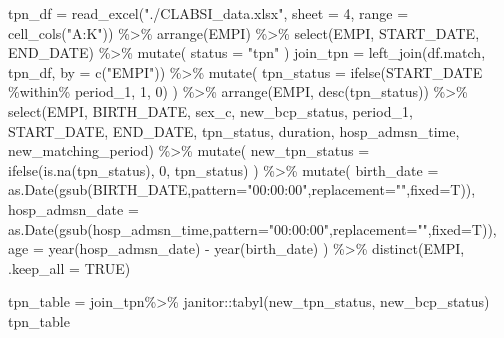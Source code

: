 \documentclass[
]{article}
\newenvironment{Shaded}{\begin{snugshade}}{\end{snugshade}}
\newcommand{\AttributeTok}[1]{\textcolor[rgb]{0.77,0.63,0.00}{#1}}
\newcommand{\ConstantTok}[1]{\textcolor[rgb]{0.00,0.00,0.00}{#1}}
\newcommand{\DecValTok}[1]{\textcolor[rgb]{0.00,0.00,0.81}{#1}}
\newcommand{\FunctionTok}[1]{\textcolor[rgb]{0.00,0.00,0.00}{#1}}
\newcommand{\NormalTok}[1]{#1}
\newcommand{\OtherTok}[1]{\textcolor[rgb]{0.56,0.35,0.01}{#1}}
\newcommand{\SpecialCharTok}[1]{\textcolor[rgb]{0.00,0.00,0.00}{#1}}
\newcommand{\StringTok}[1]{\textcolor[rgb]{0.31,0.60,0.02}{#1}}
\begin{document}
\begin{Shaded}
\begin{Highlighting}[]
\NormalTok{tpn\_df }\OtherTok{=}
   \FunctionTok{read\_excel}\NormalTok{(}\StringTok{"./CLABSI\_data.xlsx"}\NormalTok{, }\AttributeTok{sheet =} \DecValTok{4}\NormalTok{, }\AttributeTok{range =} \FunctionTok{cell\_cols}\NormalTok{(}\StringTok{"A:K"}\NormalTok{)) }\SpecialCharTok{\%\textgreater{}\%} 
  \FunctionTok{arrange}\NormalTok{(EMPI) }\SpecialCharTok{\%\textgreater{}\%} 
  \FunctionTok{select}\NormalTok{(EMPI, START\_DATE, END\_DATE) }\SpecialCharTok{\%\textgreater{}\%} 
  \FunctionTok{mutate}\NormalTok{(}
    \AttributeTok{status =} \StringTok{"tpn"}
\NormalTok{  )}
\NormalTok{join\_tpn }\OtherTok{=} 
  \FunctionTok{left\_join}\NormalTok{(df.match, tpn\_df, }\AttributeTok{by =} \FunctionTok{c}\NormalTok{(}\StringTok{"EMPI"}\NormalTok{)) }\SpecialCharTok{\%\textgreater{}\%} 
  \FunctionTok{mutate}\NormalTok{(}
    \AttributeTok{tpn\_status =} \FunctionTok{ifelse}\NormalTok{(START\_DATE }\SpecialCharTok{\%within\%}\NormalTok{ period\_1, }\DecValTok{1}\NormalTok{, }\DecValTok{0}\NormalTok{)}
\NormalTok{  ) }\SpecialCharTok{\%\textgreater{}\%} 
    \FunctionTok{arrange}\NormalTok{(EMPI, }\FunctionTok{desc}\NormalTok{(tpn\_status)) }\SpecialCharTok{\%\textgreater{}\%} 
  \FunctionTok{select}\NormalTok{(EMPI, BIRTH\_DATE, sex\_c, new\_bcp\_status, period\_1, START\_DATE, END\_DATE, tpn\_status, duration, hosp\_admsn\_time, new\_matching\_period) }\SpecialCharTok{\%\textgreater{}\%} 
  \FunctionTok{mutate}\NormalTok{(}
    \AttributeTok{new\_tpn\_status =} \FunctionTok{ifelse}\NormalTok{(}\FunctionTok{is.na}\NormalTok{(tpn\_status), }\DecValTok{0}\NormalTok{, tpn\_status)}
\NormalTok{  ) }\SpecialCharTok{\%\textgreater{}\%} 
  \FunctionTok{mutate}\NormalTok{(}
    \AttributeTok{birth\_date =} \FunctionTok{as.Date}\NormalTok{(}\FunctionTok{gsub}\NormalTok{(BIRTH\_DATE,}\AttributeTok{pattern=}\StringTok{"00:00:00"}\NormalTok{,}\AttributeTok{replacement=}\StringTok{""}\NormalTok{,}\AttributeTok{fixed=}\NormalTok{T)),}
    \AttributeTok{hosp\_admsn\_date =} \FunctionTok{as.Date}\NormalTok{(}\FunctionTok{gsub}\NormalTok{(hosp\_admsn\_time,}\AttributeTok{pattern=}\StringTok{"00:00:00"}\NormalTok{,}\AttributeTok{replacement=}\StringTok{""}\NormalTok{,}\AttributeTok{fixed=}\NormalTok{T)),}
    \AttributeTok{age =} \FunctionTok{year}\NormalTok{(hosp\_admsn\_date) }\SpecialCharTok{{-}} \FunctionTok{year}\NormalTok{(birth\_date)}
\NormalTok{  ) }\SpecialCharTok{\%\textgreater{}\%} 
    \FunctionTok{distinct}\NormalTok{(EMPI, }\AttributeTok{.keep\_all =} \ConstantTok{TRUE}\NormalTok{) }

\NormalTok{tpn\_table }\OtherTok{=}\NormalTok{ join\_tpn}\SpecialCharTok{\%\textgreater{}\%} 
\NormalTok{    janitor}\SpecialCharTok{::}\FunctionTok{tabyl}\NormalTok{(new\_tpn\_status, new\_bcp\_status)}
\NormalTok{tpn\_table}
\end{Highlighting}
\end{Shaded}
\end{document}
